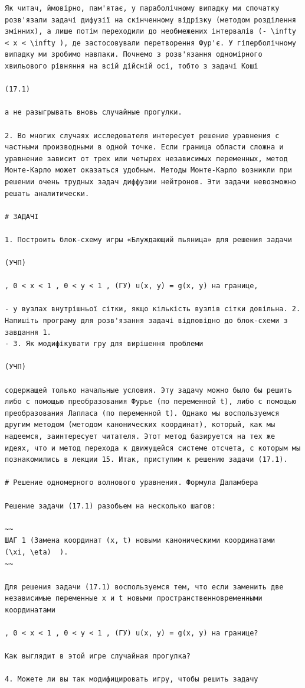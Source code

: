 \documentclass[
  ukrainian,
]{article}
\begin{document}
\begin{verbatim}
Як читач, ймовірно, пам'ятає, у параболічному випадку ми спочатку розв'язали задачі дифузії на скінченному відрізку (методом розділення змінних), а лише потім переходили до необмежених інтервалів (- \infty < x < \infty ), де застосовували перетворення Фур'є. У гіперболічному випадку ми зробимо навпаки. Почнемо з розв'язання одномірного хвильового рівняння на всій дійсній осі, тобто з задачі Коші

(17.1)

а не разыгрывать вновь случайные прогулки.

2. Во многих случаях исследователя интересует решение уравнения с частными производными в одной точке. Если граница области сложна и уравнение зависит от трех или четырех независимых переменных, метод Монте-Карло может оказаться удобным. Методы Монте-Карло возникли при решении очень трудных задач диффузии нейтронов. Эти задачи невозможно решать аналитически.

# ЗАДАЧІ

1. Построить блок-схему игры «Блуждающий пьяница» для решения задачи

(УЧП)

, 0 < x < 1 , 0 < y < 1 , (ГУ) u(x, y) = g(x, y) на границе,

- у вузлах внутрішньої сітки, якщо кількість вузлів сітки довільна. 2. Напишіть програму для розв'язання задачі відповідно до блок-схеми з завдання 1.
- 3. Як модифікувати гру для вирішення проблеми

(УЧП)

содержащей только начальные условия. Эту задачу можно было бы решить либо с помощью преобразования Фурье (по переменной t), либо с помощью преобразования Лапласа (по переменной t). Однако мы воспользуемся другим методом (методом канонических координат), который, как мы надеемся, заинтересует читателя. Этот метод базируется на тех же идеях, что и метод перехода к движущейся системе отсчета, с которым мы познакомились в лекции 15. Итак, приступим к решению задачи (17.1).

# Решение одномерного волнового уравнения. Формула Даламбера

Решение задачи (17.1) разобьем на несколько шагов:

~~
ШАГ 1 (Замена координат (x, t) новыми каноническими координатами   (\xi, \eta)  ).
~~

Для решения задачи (17.1) воспользуемся тем, что если заменить две независимые переменные x и t новыми пространственновременными координатами

, 0 < x < 1 , 0 < y < 1 , (ГУ) u(x, y) = g(x, y) на границе?

Как выглядит в этой игре случайная прогулка?

4. Можете ли вы так модифицировать игру, чтобы решить задачу
\end{verbatim}
\end{document}
